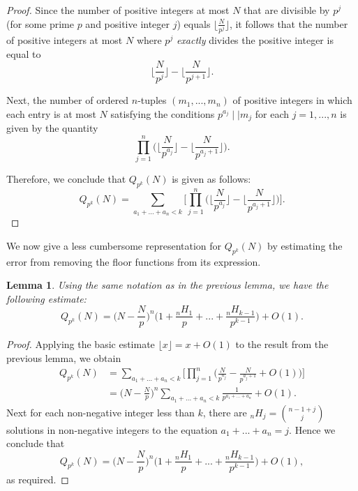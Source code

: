 \documentclass[12pt]{amsart}
\newtheorem{lemma}[theorem]{Lemma}
\theoremstyle{definition}
\begin{document}
\begin{proof}
	Since the number of positive integers at most $N$ that are divisible by $p^j$ (for some prime $p$ and positive integer $j$) equals $\lfloor\frac{N}{p^j}\rfloor$, it follows that the number of positive integers at most $N$ where $p^j$ \textit{exactly} divides the positive integer is equal to
	$$\Big\lfloor\frac{N}{p^j}\Big\rfloor - \Big\lfloor\frac{N}{p^{j+1}}\Big\rfloor.$$
	
	\noindent Next, the number of ordered $n$-tuples $(m_1, ..., m_n)$ of positive integers in which each entry is at most $N$ satisfying the conditions $p^{a_j} \mid\mid m_j$ for each $j = 1, ..., n$ is given by the quantity
	$$\prod_{j=1}^n \Big(\Big\lfloor\frac{N}{p^{a_j}}\Big\rfloor - \Big\lfloor\frac{N}{p^{a_j+1}}\Big\rfloor\Big).$$
	
	\noindent Therefore, we conclude that $Q_{p^k}(N)$ is given as follows:
	$$Q_{p^k}(N) = \sum_{a_1+...+a_n < k} \Big[\prod_{j=1}^n \Big(\Big\lfloor \frac{N}{p^{a_j}}\Big\rfloor - \Big\lfloor \frac{N}{p^{a_j + 1}}\Big\rfloor\Big)\Big].$$
\end{proof}

We now give a less cumbersome representation for $Q_{p^k}(N)$ by estimating the error from removing the floor functions from its expression.

\begin{lemma}
	Using the same notation as in the previous lemma, we have the following estimate:
	$$Q_{p^k}(N) = \Big(N - \frac{N}{p}\Big)^n \Big(1 + \frac{{}_nH_1}{p} + ... + \frac{{}_nH_{k-1}}{p^{k-1}}\Big) + O(1).$$
\end{lemma}

\begin{proof}
	Applying the basic estimate $\lfloor x \rfloor  = x + O(1)$ to the result from the previous lemma, we obtain
	\begin{align*} Q_{p^k}(N) &= \sum_{a_1+...+a_n < k} \Big[\prod_{j=1}^n \Big( \frac{N}{p^{a_j}} - \frac{N}{p^{a_j + 1}} + O(1)\Big)\Big]\\ &= \Big(N - \frac{N}{p}\Big)^n \sum_{a_1+...+a_n < k} \frac{1}{p^{a_1 + ... + a_n}} + O(1). \end{align*} 
	\noindent Next for each non-negative integer less than $k$, there are ${}_nH_j = \binom{n-1+j}{j}$ solutions in non-negative integers to the equation $a_1+...+a_n = j$. Hence we conclude that
	$$Q_{p^k}(N) = \Big(N - \frac{N}{p}\Big)^n \Big(1 + \frac{{}_nH_1}{p} + ... + \frac{{}_nH_{k-1}}{p^{k-1}}\Big) + O(1),$$
	as required.
\end{proof}
\end{document}
